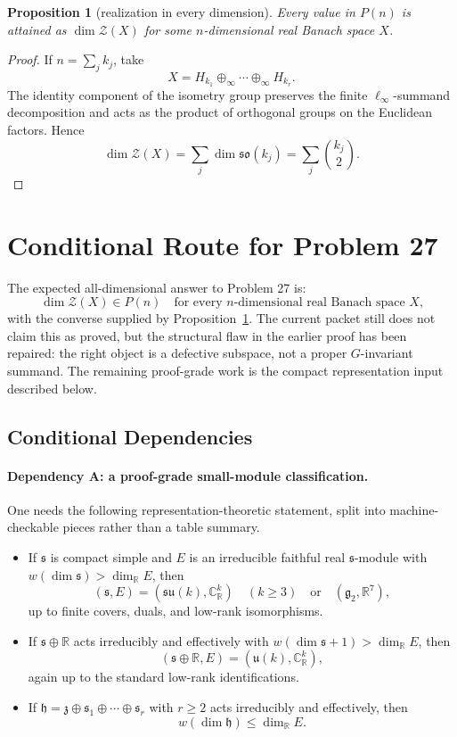 \documentclass[11pt]{article}
\newtheorem{proposition}[theorem]{Proposition}
\theoremstyle{remark}
\newcommand{\R}{\mathbb R}
\newcommand{\C}{\mathbb C}
\newcommand{\fh}{\mathfrak h}
\newcommand{\fs}{\mathfrak s}
\newcommand{\fz}{\mathfrak z}
\newcommand{\so}{\mathfrak{so}}
\newcommand{\su}{\mathfrak{su}}
\begin{document}
\begin{proposition}[realization in every dimension]\label{prop:realization}
Every value in \(P(n)\) is attained as \(\dim\mathcal Z(X)\) for some
\(n\)-dimensional real Banach space \(X\).
\end{proposition}

\begin{proof}
If \(n=\sum_j k_j\), take
\[
 X=H_{k_1}\oplus_\infty\cdots\oplus_\infty H_{k_r}.
\]
The identity component of the isometry group preserves the finite
\(\ell_\infty\)-summand decomposition and acts as the product of orthogonal
groups on the Euclidean factors.  Hence
\[
 \dim\mathcal Z(X)=\sum_j\dim\so(k_j)=\sum_j\binom{k_j}{2}.
\]
\end{proof}

\section{Conditional Route for Problem 27}

The expected all-dimensional answer to Problem 27 is:
\[
 \dim\mathcal Z(X)\in P(n)
 \quad\text{for every \(n\)-dimensional real Banach space \(X\),}
\]
with the converse supplied by Proposition~\ref{prop:realization}.  The
current packet still does not claim this as proved, but the structural flaw in
the earlier proof has been repaired: the right object is a defective subspace,
not a proper \(G\)-invariant summand.  The remaining proof-grade work is the
compact representation input described below.

\subsection*{Conditional Dependencies}

\paragraph{Dependency A: a proof-grade small-module classification.}
One needs the following representation-theoretic statement, split into
machine-checkable pieces rather than a table summary.

\begin{itemize}[leftmargin=2em]
\item If \(\fs\) is compact simple and \(E\) is an irreducible faithful real
\(\fs\)-module with \(w(\dim\fs)>\dim_\R E\), then
\[
(\fs,E)=(\su(k),\C^k_\R)\quad(k\geq3)
\quad\text{or}\quad
(\mathfrak g_2,\R^7),
\]
up to finite covers, duals, and low-rank isomorphisms.
\item If \(\fs\oplus\R\) acts irreducibly and effectively with
\(w(\dim\fs+1)>\dim_\R E\), then
\[
(\fs\oplus\R,E)=(\mathfrak u(k),\C^k_\R),
\]
again up to the standard low-rank identifications.
\item If
\(\fh=\fz\oplus\fs_1\oplus\cdots\oplus\fs_r\) with \(r\geq2\) acts
irreducibly and effectively, then
\[
 w(\dim\fh)\leq\dim_\R E.
\]
\end{itemize}
\end{document}
